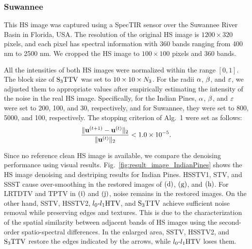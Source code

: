 \documentclass[10pt,journal]{IEEEtran}
\begin{document}
\subsubsection{Suwannee} This HS image was captured using a SpecTIR sensor over the Suwannee River Basin in Florida, USA.
The resolution of the original HS image is $1200 \times 320$ pixels, and each pixel has spectral information with 360 bands ranging from 400 nm to 2500 nm.
We cropped the HS image to $100 \times 100$ pixels and 360 bands.

All the intensities of both HS images were normalized within the range $[0, 1]$.
The block size of ${\text{S}_{3} \text{TTV}}$ was set to $10 \times 10 \times N_{3}$.
For the radii $\alpha$, $\beta$, and $\varepsilon$, we adjusted them to appropriate values after empirically estimating the intensity of the noise in the real HS image.
Specifically, for the Indian Pines, $\alpha$, $\beta$, and $\varepsilon$ were set to 200, 100, and 30, respectively, and for Suwannee, they were set to 800, 5000, and 100, respectively.
The stopping criterion of Alg.~1 were set as follows:
\begin{equation}
    \label{eq:StopCri_real}
    \frac{\| \mathbf{u}^{(t+1)} - \mathbf{u}^{(t)} \|_2}{\| \mathbf{u}^{(t)}\|_{2}} < 1.0 \times 10^{-5}.
\end{equation}

Since no reference clean HS image is available, we compare the denoising performance using visual results.
Fig.~\ref{fig:result_image_IndianPines} shows the HS image denoising and destriping results for Indian Pines.
HSSTV1, STV, and SSST cause over-smoothing in the restored images of 
$\text{(d)}$, $\text{(g)}$, and $\text{(h)}$.
For LRTDTV and TPTV in $\text{(i)}$ and $\text{(j)}$, noise remains in the restored images.
On the other hand, SSTV, HSSTV2, ${l_{0}\text{-}l_{1}\text{HTV}}$, and ${\text{S}_{3} \text{TTV}}$ achieve sufficient noise removal while preserving edges and textures. 
This is due to the characterization of the spatial similarity between adjacent bands of HS images using the second-order spatio-spectral differences.
In the enlarged area, SSTV, HSSTV2, and ${\text{S}_{3} \text{TTV}}$ restore the edges indicated by the arrows, while ${l_{0}\text{-}l_{1}\text{HTV}}$ loses them.
\end{document}
